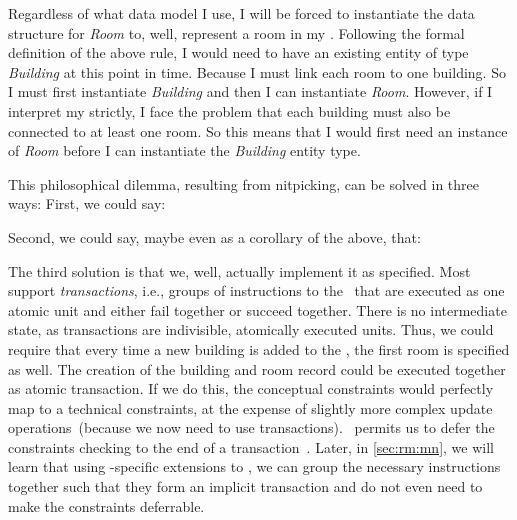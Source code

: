 Regardless of what data model I use, I will be forced to instantiate the data structure for \emph{Room} to, well, represent a room in my \db.
Following the formal definition of the above rule, I would need to have an existing entity of type \emph{Building} at this point in time.
Because I must link each room to one building.
So I must first instantiate \emph{Building} and then I can instantiate \emph{Room}.
However, if I interpret my  strictly, I face the problem that each building must also be connected to at least one room.
So this means that I would first need an instance of \emph{Room} before I can instantiate the \emph{Building} entity type.

This philosophical dilemma, resulting from nitpicking, can be solved in three ways:
First, we could say:
\emph{}

Second, we could say, maybe even as a corollary of the above, that:
\emph{}

The third solution is that we, well, actually implement it as specified.
Most  support \emph{transactions}, i.e., groups of instructions to the \db\ that are executed as one atomic unit and either fail together or succeed together.
There is no intermediate state, as transactions are indivisible, atomically executed units.
Thus, we could require that every time a new building is added to the \db, the first room is specified as well.
The creation of the building and room record could be executed together as atomic transaction.
If we do this, the conceptual constraints would perfectly map to a technical constraints, at the expense of slightly more complex update operations~(because we now need to use transactions).
\postgresql\ permits us to defer the constraints checking to the end of a transaction~\cite{PGDG:PD:SC:SC,N2016SSFA:DC}.
Later, in \cref{sec:rm:mn}, we will learn that using \postgresql-specific extensions to \sql, we can group the necessary instructions together such that they form an implicit transaction and do not even need to make the constraints deferrable.

